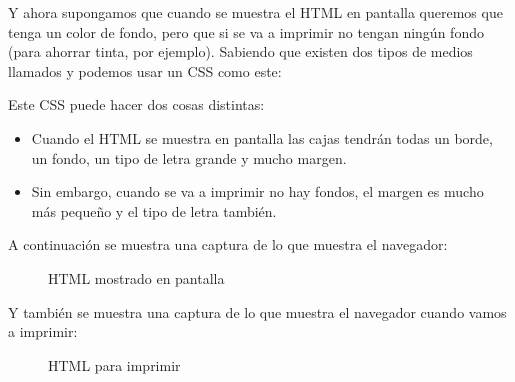 \documentclass[letterpaper,10pt,spanish]{sphinxmanual}
\begin{document}
Y ahora supongamos que cuando se muestra el HTML en pantalla queremos que tenga un color de fondo, pero que si se va a imprimir no tengan ningún fondo (para ahorrar tinta, por ejemplo). Sabiendo que existen dos tipos de medios llamados  y  podemos usar un CSS como este:

\begin{sphinxVerbatim}[commandchars=\\\{\}]
  
         
           
         
         
  
         
         
\end{sphinxVerbatim}

Este CSS puede hacer dos cosas distintas:
\begin{itemize}
\item {} 
Cuando el HTML se muestra en pantalla las cajas tendrán todas un borde, un fondo, un tipo de letra grande y mucho margen.

\item {} 
Sin embargo, cuando se va a imprimir no hay fondos, el margen es mucho más pequeño y el tipo de letra también.

\end{itemize}

A continuación se muestra una captura de lo que muestra el navegador:

\begin{figure}[htbp]
\centering
\capstart

\noindent{}
\caption{HTML mostrado en pantalla}\label{\detokenize{tema3:id12}}\end{figure}

Y también se muestra una captura de lo que muestra el navegador cuando vamos a imprimir:

\begin{figure}[htbp]
\centering
\capstart

\noindent{}
\caption{HTML para imprimir}\label{\detokenize{tema3:id13}}\end{figure}
\end{document}
